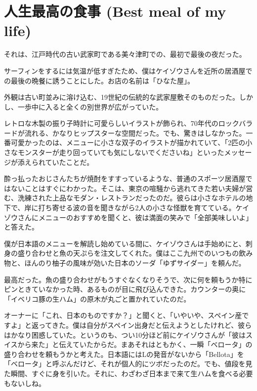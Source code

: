 \documentclass[
  letterpaper,
  oneside]{scrbook}
\begin{document}

\chapter{人生最高の食事 (Best meal of my
life)}\label{ux4ebaux751fux6700ux9ad8ux306eux98dfux4e8b-best-meal-of-my-life}

それは、江戸時代の古い武家町である美々津町での、最初で最後の夜だった。

サーフィンをするには気温が低すぎたため、僕はケイゾウさんを近所の居酒屋での最後の晩餐に誘うことにした。お店の名前は「ひなた屋」。

外観は古い町並みに溶け込む、19世紀の伝統的な武家屋敷そのものだった。しかし、一歩中に入ると全くの別世界が広がっていた。

レトロな木製の振り子時計に可愛らしいイラストが飾られ、70年代のロックバラードが流れる、かなりヒップスターな空間だった。でも、驚きはしなかった。一番可愛かったのは、メニューに小さな双子のイラストが描かれていて、「2匹の小さなモンスターが走り回っていても気にしないでくださいね」といったメッセージが添えられていたことだ。

酔っ払ったおじさんたちが焼酎をすすっているような、普通のスポーツ居酒屋ではないことはすぐにわかった。そこは、東京の喧騒から逃れてきた若い夫婦が営む、洗練された上品なモダン・レストランだったのだ。彼らは小さなホテルの地下で、岸に打ち寄せる波の音を聞きながら2人の小さな怪獣を育てている。ケイゾウさんにメニューのおすすめを聞くと、彼は満面の笑みで「全部美味しいよ」と答えた。

僕が日本語のメニューを解読し始めている間に、ケイゾウさんは手始めにと、刺身の盛り合わせと魚の天ぷらを注文してくれた。僕はここ九州でのいつもの飲み物と、ほんのり柚子の風味が効いた日本のソーダ「ゆずサイダー」を頼んだ。

最高だった。魚の盛り合わせがもうすぐなくなりそうで、次に何を頼もうか特にピンときていなかった時、あるものが目に飛び込んできた。カウンターの奥に「イベリコ豚の生ハム」の原木が丸ごと置かれていたのだ。

オーナーに「これ、日本のものですか？」と聞くと、「いやいや、スペイン産ですよ」と返ってきた。僕は自分がスペイン出身だと伝えようとしたけれど、彼らはかなり困惑していた。というのも、つい10分ほど前にケイゾウさんが「彼はスイスから来た」と伝えていたからだ。まあそれはともかく、一瞬「ベロータ」の盛り合わせを頼もうかと考えた。日本語にはLの発音がないから「Bellota」を「ベロータ」と呼ぶんだけど、それが個人的にツボだったのだ。でも、値段を見た瞬間、すぐに身を引いた。それに、わざわざ日本まで来て生ハムを食べる必要もないしね。
\end{document}
